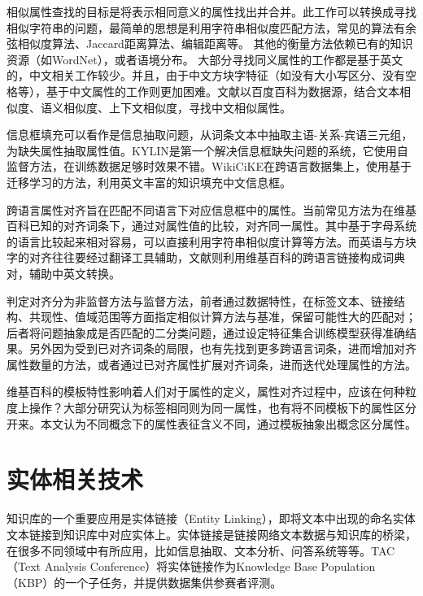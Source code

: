 {\heiti 相似属性查找}的目标是将表示相同意义的属性找出并合并。此工作可以转换成寻找相似字符串的问题，最简单的思想是利用字符串相似度匹配方法，常见的算法有余弦相似度算法、Jaccard距离算法、编辑距离等。
其他的衡量方法依赖已有的知识资源（如WordNet）\cite{yang2005measuring}，或者语境分布\cite{pantel2009web}。
大部分寻找同义属性的工作都是基于英文的，中文相关工作较少。并且，由于中文方块字特征（如没有大小写区分、没有空格等），基于中文属性的工作则更加困难。文献\cite{liu2014extracting}以百度百科为数据源，结合文本相似度、语义相似度、上下文相似度，寻找中文相似属性。

{\heiti 信息框填充}可以看作是信息抽取问题，从词条文本中抽取主语-关系-宾语三元组，为缺失属性抽取属性值。KYLIN\cite{wu2007autonomously}是第一个解决信息框缺失问题的系统，它使用自监督方法，在训练数据足够时效果不错。WikiCiKE\cite{wang2013transfer}在跨语言数据集上，使用基于迁移学习的方法，利用英文丰富的知识填充中文信息框。

{\heiti 跨语言属性对齐}旨在匹配不同语言下对应信息框中的属性。当前常见方法为在维基百科已知的对齐词条下，通过对属性值的比较，对齐同一属性。其中基于字母系统的语言比较起来相对容易，可以直接利用字符串相似度计算等方法\cite{bouma2009cross}。而英语与方块字的对齐往往要经过翻译工具辅助\cite{fu2009cross}，文献\cite{nguyen2011multilingual}则利用维基百科的跨语言链接构成词典对，辅助中英文转换。

判定对齐分为非监督方法与监督方法，前者通过数据特性，在标签文本、链接结构、共现性、值域范围等方面指定相似计算方法与基准，保留可能性大的匹配对\cite{nguyen2011multilingual,lin2011unsupervised}；后者将问题抽象成是否匹配的二分类问题\cite{adar2009information}，通过设定特征集合训练模型获得准确结果。另外因为受到已对齐词条的局限，也有先找到更多跨语言词条，进而增加对齐属性数量的方法\cite{rinser2013cross}，或者通过已对齐属性扩展对齐词条，进而迭代处理属性的方法\cite{nguyen2013slint}。

维基百科的模板特性影响着人们对于属性的定义，属性对齐过程中，应该在何种粒度上操作？大部分研究认为标签相同则为同一属性\cite{adar2009information,nguyen2011multilingual}，也有将不同模板下的属性区分开来\cite{bouma2009cross}。本文认为不同概念下的属性表征含义不同，通过模板抽象出概念区分属性。

\section{实体相关技术}
\label{sec:entity-research}

知识库的一个重要应用是实体链接（Entity Linking），即将文本中出现的命名实体文本链接到知识库中对应实体上。实体链接是链接网络文本数据与知识库的桥梁，在很多不同领域中有所应用，比如信息抽取\cite{lin2012entity,nakashole2012patty}、文本分析\cite{gattani2013entity}、问答系统\cite{gattani2013entity,welty2012comparison}等等。TAC（Text Analysis Conference）将实体链接作为Knowledge Base Population（KBP）的一个子任务，并提供数据集供参赛者评测。

